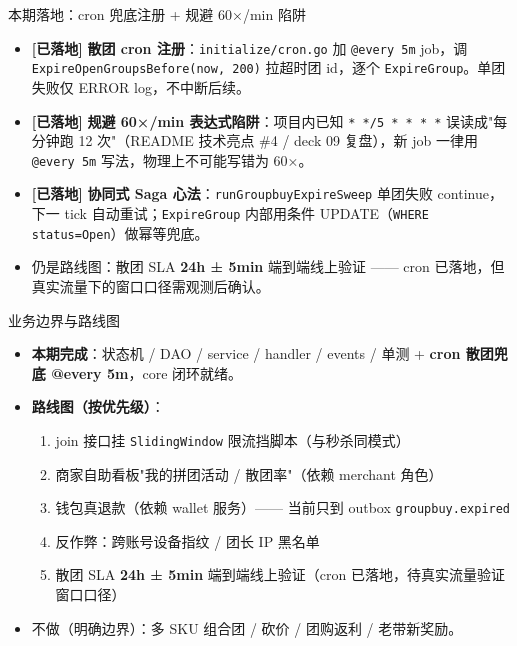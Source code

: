 \documentclass[aspectratio=169,11pt]{beamer}
\begin{document}
\begin{frame}[shrink]{本期落地：cron 兜底注册 + 规避 60×/min 陷阱}
\begin{itemize}
  \item \textcolor{cOK}{\textbf{[已落地]}} \textbf{散团 cron 注册}：\texttt{initialize/cron.go} 加 \texttt{@every 5m} job，调 \texttt{ExpireOpenGroupsBefore(now, 200)} 拉超时团 id，逐个 \texttt{ExpireGroup}。单团失败仅 ERROR log，不中断后续。
  \item \textcolor{cOK}{\textbf{[已落地]}} \textbf{规避 60×/min 表达式陷阱}：项目内已知 \texttt{* */5 * * * *} 误读成"每分钟跑 12 次"（README 技术亮点 \#4 / deck 09 复盘），新 job 一律用 \texttt{@every 5m} 写法，物理上不可能写错为 60×。
  \item \textcolor{cOK}{\textbf{[已落地]}} \textbf{协同式 Saga 心法}：\texttt{runGroupbuyExpireSweep} 单团失败 continue，下一 tick 自动重试；\texttt{ExpireGroup} 内部用条件 UPDATE（\texttt{WHERE status=Open}）做幂等兜底。
  \item 仍是路线图：散团 SLA \textbf{24h ± 5min} 端到端线上验证 —— cron 已落地，但真实流量下的窗口口径需观测后确认。
\end{itemize}
\end{frame}

\begin{frame}[shrink]{业务边界与路线图}
\begin{itemize}
  \item \textbf{本期完成}：状态机 / DAO / service / handler / events / 单测 + \textcolor{cOK}{\textbf{cron 散团兜底 @every 5m}}，core 闭环就绪。
  \item \textbf{路线图（按优先级）}：
  \begin{enumerate}
    \item join 接口挂 \texttt{SlidingWindow} 限流挡脚本（与秒杀同模式）
    \item 商家自助看板"我的拼团活动 / 散团率"（依赖 merchant 角色）
    \item 钱包真退款（依赖 wallet 服务）—— 当前只到 outbox \texttt{groupbuy.expired}
    \item 反作弊：跨账号设备指纹 / 团长 IP 黑名单
    \item 散团 SLA \textbf{24h ± 5min} 端到端线上验证（cron 已落地，待真实流量验证窗口口径）
  \end{enumerate}
  \item 不做（明确边界）：多 SKU 组合团 / 砍价 / 团购返利 / 老带新奖励。
\end{itemize}
\end{frame}
\end{document}
